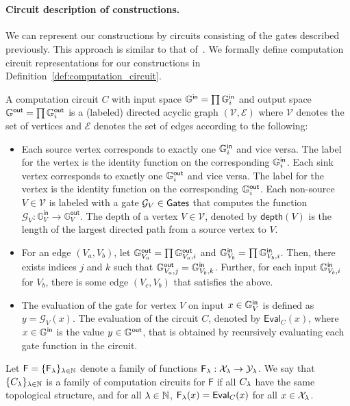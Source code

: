 
~


\iffull
\paragraph{Circuit description of constructions.}
We can represent our constructions by circuits consisting of the gates described previously. This approach is similar to that of~\cite{boyle2019-fss-preprocess}. We formally define computation circuit representations for our constructions in Definition~\ref{def:computation_circuit}.

\begin{definition}
A computation circuit $C$ with input space $\mathbb{G}^{\textsf{in}} = \prod \mathbb{G}^{\textsf{in}}_i$ and output space $\mathbb{G}^{\textsf{out}} = \prod \mathbb{G}^{\textsf{out}}_i$ is a (labeled) directed acyclic graph $(\mathcal{V},\mathcal{E})$ where $\mathcal{V}$ denotes the set of vertices and $\mathcal{E}$ denotes the set of edges according to the following:
\begin{itemize}

\item Each source vertex corresponds to exactly one $\mathbb{G}^{\textsf{in}}_i$ and vice versa. The label for the vertex is the identity function on the corresponding $\mathbb{G}^{\textsf{in}}_i$. Each sink vertex corresponds to exactly one $\mathbb{G}^{\textsf{out}}_i$ and vice versa. The label for the vertex is the identity function on the corresponding $\mathbb{G}^{\textsf{out}}_i$. Each non-source $V \in \mathcal{V}$ is labeled with a gate $\mathcal{G}_V \in \textnormal{\textsf{Gates}}$ that computes the function $\mathcal{G}_V: \mathbb{G}^{\textsf{in}}_V \to \mathbb{G}^{\textsf{out}}_V$. The depth of a vertex $V \in \mathcal{V}$, denoted by $\textsf{depth}(V)$ is the length of the largest directed path from a source vertex to $V$.


\item For an edge $(V_a, V_b)$, let $\mathbb{G}^{\textsf{out}}_{V_a} = \prod \mathbb{G}^{\textsf{out}}_{V_a,i}$ and $\mathbb{G}^{\textsf{in}}_{V_b} = \prod \mathbb{G}^{\textsf{in}}_{V_b, i}$. Then, there exists indices $j$ and $k$ such that $\mathbb{G}^{\textsf{out}}_{V_a,j} = \mathbb{G}^{\textsf{in}}_{V_b,k}$. Further, for each input $\mathbb{G}^{\textsf{in}}_{V_b,i}$ for $V_b$, there is some edge $(V_c, V_b)$ that satisfies the above.

\item The evaluation of the gate for vertex $V$ on input $x \in \mathbb{G}^{\textsf{in}}_V$ is defined as $y = \mathcal{G}_V(x)$. The evaluation of the circuit $C$, denoted by $\textsf{Eval}_C(x)$, where $x \in \mathbb{G}^{\textsf{in}}$ is the value $y \in \mathbb{G}^{\textsf{out}}$, that is obtained by recursively evaluating each gate function in the circuit.
\end{itemize}


Let $\mathsf{F} = \{\mathsf{F}_\lambda\}_{\lambda \in \mathbb{N}}$ denote a family of functions $\mathsf{F}_\lambda:\mathcal{X}_\lambda \to \mathcal{Y}_\lambda$. We say that $\{C_\lambda\}_{\lambda \in \mathbb{N}}$ is a family of computation circuits for $\mathsf{F}$ if all $C_\lambda$ have the same topological structure, and for all $\lambda \in \mathbb{N}$, $\mathsf{F}_\lambda(x) = \textsf{Eval}_C(x)$ for all $x \in \mathcal{X}_\lambda$.
\label{def:computation_circuit}
\end{definition}
\fi

